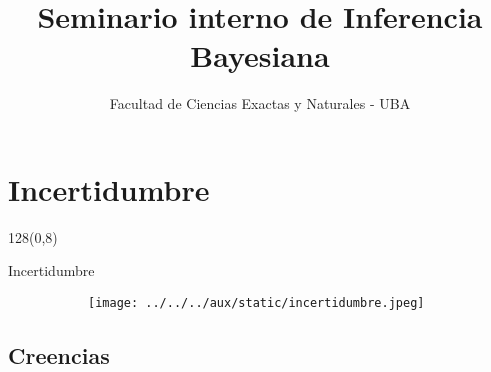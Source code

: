 \documentclass[shownotes]{beamer}
\title[Inferencia Bayesiana]{Seminario interno de Inferencia Bayesiana}
\author[FCEN - UBA]{Facultad de Ciencias Exactas y Naturales - UBA}
\institute[DC-ICC-CONICET]{\vspace{1.25cm} \texttt{[image: ../../../aux/static/logofcen]}}
\date{}
\begin{document}
\small

\begin{frame}[noframenumbering]
 
% 
 \vspace{2cm}
\maketitle
 
\end{frame}


\section{Incertidumbre}
\begin{frame}
\begin{textblock}{128}(0,8)
\begin{center}
 \Large Incertidumbre
\end{center}
\end{textblock}

\vspace{0.75cm}

\begin{figure}[H]     
     \centering \normalsize
     \begin{subfigure}[b]{0.75\textwidth}
       \texttt{[image: ../../../aux/static/incertidumbre.jpeg]} 
     \end{subfigure}
\end{figure}

\end{frame}

\subsection{Creencias}
\end{document}
